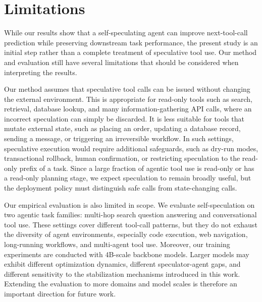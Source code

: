\section*{Limitations}

While our results show that a self-speculating agent can improve next-tool-call
prediction while preserving downstream task performance, the present study is an
initial step rather than a complete treatment of speculative tool use. Our
method and evaluation still have several limitations that should be considered
when interpreting the results.

Our method assumes that speculative tool calls can be issued without changing the
external environment. This is appropriate for read-only tools such as search,
retrieval, database lookup, and many information-gathering API calls, where an
incorrect speculation can simply be discarded. It is less suitable for tools
that mutate external state, such as placing an order, updating a database
record, sending a message, or triggering an irreversible workflow. In such
settings, speculative execution would require additional safeguards, such as
dry-run modes, transactional rollback, human confirmation, or restricting
speculation to the read-only prefix of a task. Since a large fraction of agentic
tool use is read-only or has a read-only planning stage, we expect speculation
to remain broadly useful, but the deployment policy must distinguish safe calls
from state-changing calls.

Our empirical evaluation is also limited in scope. We evaluate self-speculation
on two agentic task families: multi-hop search question answering and
conversational tool use. These settings cover different tool-call patterns,
but they do not exhaust the diversity of agent environments, especially code
execution, web navigation, long-running workflows, and multi-agent tool use.
Moreover, our training experiments are conducted with 4B-scale backbone models.
Larger models may exhibit different optimization dynamics, different
speculator-agent gaps, and different sensitivity to the stabilization mechanisms
introduced in this work. Extending the evaluation to more domains and model
scales is therefore an important direction for future work.
